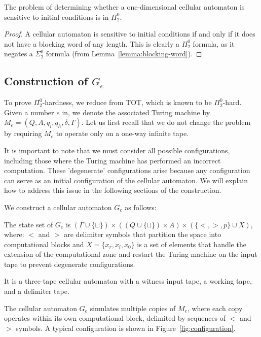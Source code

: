 \documentclass{llncs}
\begin{document}
\begin{lemma}\label{lemma:sensitivity-pi02}
The problem of determining whether a one-dimensional cellular automaton is sensitive to initial conditions is in $\Pi^0_2$.
\end{lemma}

\begin{proof}
A cellular automaton is sensitive to initial conditions if and only if it does not have a blocking word of any length. This is clearly a $\Pi^0_2$ formula, as it negates a $\Sigma^0_2$ formula (from Lemma~\ref{lemma:blocking-word}).
\end{proof}

\subsection{Construction of $G_e$}

To prove $\Pi^0_2$-hardness, we reduce from TOT, which is known to be $\Pi^0_2$-hard. Given a number $e$ in, we denote the associated Turing machine by $M_e = (Q, A, q_i, q_h, \delta, \Gamma)$. Let us first recall that we do not change the problem by requiring $M_e$ to operate only on a one-way infinite tape.  

It is important to note that we must consider all possible configurations, including those where the Turing machine has performed an incorrect computation. These 'degenerate' configurations arise because any configuration can serve as an initial configuration of the cellular automaton. We will explain how to address this issue in the following sections of the construction.

We construct a cellular automaton $G_e$ as follows:

The state set of $G_e$ is $(\Gamma \cup \{\sqcup\}) \times ((Q \cup \{\sqcup\}) \times A) \times (\{<, >, p\} \cup X)$, where: $<$ and $>$ are delimiter symbols that partition the space into computational blocks and $X= \{x_r, x_l, x_0\}$ is a set of elements that handle the extension of the computational zone and restart the Turing machine on the input tape to prevent degenerate configurations. 


It is a three-tape cellular automaton with a witness input tape, a working tape, and a delimiter tape.

The cellular automaton $G_e$ simulates multiple copies of $M_e$, where each copy operates within its own computational block, delimited by sequences of $<$ and $>$ symbols. A typical configuration is shown in Figure~\ref{fig:configuration}.
\end{document}

